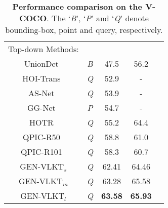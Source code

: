 \documentclass[10pt,twocolumn,letterpaper]{article}
\begin{document}
\begin{table}[t]
\begin{center}
\begin{tabular}{ccccc}
  \hline 
  Top-down Methods:     &                                    &  &\\
  UnionDet~\cite{Kim2020_unidet}		&\emph{B}			        &47.5  &56.2\\
  HOI-Trans~\cite{zou2021_hoitrans}		&\emph{Q}			        &52.9  &-\\
  AS-Net~\cite{chen_2021_asnet}		&\emph{Q}		        &53.9  &-\\
  GG-Net~\cite{zhong2021glance} &\emph{P}		        &54.7  &-\\
  HOTR~\cite{Kim_2021_CVPR} &\emph{Q}			        &55.2  & 64.4\\
  QPIC-R50~\cite{tamura2021qpic}		&\emph{Q}			        &58.8  &61.0 \\
  QPIC-R101~\cite{tamura2021qpic}		&\emph{Q}			        &58.3  &60.7 \\
  \cellcolor{mygray-bg}GEN-VLKT$_s$			 	&\cellcolor{mygray-bg}\emph{Q}			        &\cellcolor{mygray-bg}62.41 &\cellcolor{mygray-bg}64.46\\
    \cellcolor{mygray-bg}GEN-VLKT$_m$			 	&\cellcolor{mygray-bg}\emph{Q}			        &\cellcolor{mygray-bg}63.28  &\cellcolor{mygray-bg}65.58\\
    \cellcolor{mygray-bg}GEN-VLKT$_l$			 	&\cellcolor{mygray-bg}\emph{Q}			        &\cellcolor{mygray-bg}\textbf{63.58}  &\cellcolor{mygray-bg}\textbf{65.93}\\
  \hline
  \end{tabular}
  \end{center}
  \vspace{-3mm}
  \caption{\textbf{Performance comparison on the V-COCO}. The `\emph{B}', `\emph{P}' and `\emph{Q}' denote bounding-box, point and query, respectively.}
  \vspace{-3mm}
  \label{tb:vcoco}
\end{table}
\end{document}
